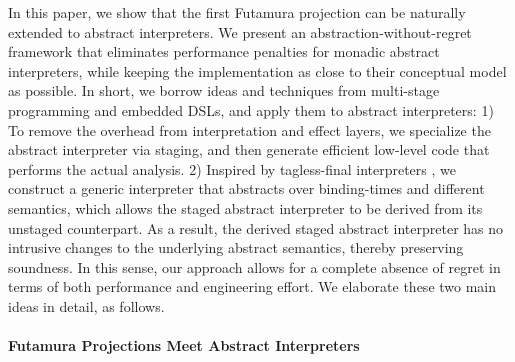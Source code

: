In this paper, we show that the first Futamura projection can be naturally
extended to abstract interpreters. We present an abstraction-without-regret
framework that eliminates performance penalties for monadic abstract
interpreters, while keeping the implementation as close to their conceptual
model as possible. In short, we borrow ideas and techniques from multi-stage
programming and embedded DSLs, and apply them to abstract interpreters:  1) To
remove the overhead from interpretation and effect layers, we specialize the
abstract interpreter via staging, and then generate efficient low-level code
that performs the actual analysis. 2) Inspired by tagless-final interpreters
\cite{DBLP:journals/jfp/CaretteKS09}, we construct a generic interpreter that
abstracts over binding-times \cite{Ofenbeck:2017:SGP:3136040.3136060,
Amin:2017:CTI:3177123.3158140} and different semantics, which allows the staged
abstract interpreter to be derived from its unstaged counterpart.  As a result,
the derived staged abstract interpreter has no intrusive changes to the
underlying abstract semantics, thereby preserving soundness.  In this sense, our
approach allows for a complete absence of regret in terms of both performance
and engineering effort. We elaborate these two main ideas in detail, as follows.




\paragraph{Futamura Projections Meet Abstract Interpreters}

